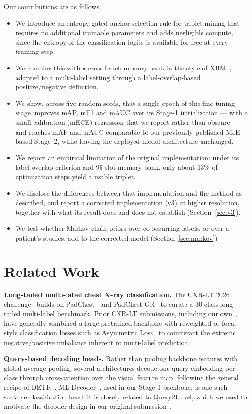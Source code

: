 \documentclass[conference]{IEEEtran}
\begin{document}
Our contributions are as follows.
\begin{itemize}
\item We introduce an entropy-gated anchor selection rule for triplet mining that requires no additional trainable parameters and adds negligible compute, since the entropy of the classification logits is available for free at every training step.
\item We combine this with a cross-batch memory bank in the style of XBM~\cite{b6}, adapted to a multi-label setting through a label-overlap-based positive/negative definition.
\item We show, across five random seeds, that a single epoch of this fine-tuning stage improves mAP, mF1 and mAUC over its Stage-1 initialization --- with a small calibration (mECE) regression that we report rather than obscure --- and reaches mAP and mAUC comparable to our previously published MoE-based Stage~2, while leaving the deployed model architecture unchanged.
\item We report an empirical limitation of the original implementation: under its label-overlap criterion and 96-slot memory bank, only about 13\% of optimization steps yield a usable triplet.
\item We disclose the differences between that implementation and the method as described, and report a corrected implementation (v3) at higher resolution, together with what its result does and does not establish (Section~\ref{sec:v3}).
\item We test whether Markov-chain priors over co-occurring labels, or over a patient's studies, add to the corrected model (Section~\ref{sec:markov}).
\end{itemize}

\section{Related Work}
\textbf{Long-tailed multi-label chest X-ray classification.} The CXR-LT 2026 challenge~\cite{b12} builds on PadChest~\cite{b9} and PadChest-GR~\cite{b10} to curate a 30-class long-tailed multi-label benchmark. Prior CXR-LT submissions, including our own~\cite{b12}, have generally combined a large pretrained backbone with reweighted or focal-style classification losses such as Asymmetric Loss~\cite{b3} to counteract the extreme negative/positive imbalance inherent to multi-label prediction.

\textbf{Query-based decoding heads.} Rather than pooling backbone features with global average pooling, several architectures decode one query embedding per class through cross-attention over the visual feature map, following the general recipe of DETR~\cite{b13}. ML-Decoder~\cite{b2}, used in our Stage-1 backbone, is one such scalable classification head; it is closely related to Query2Label, which we used to motivate the decoder design in our original submission~\cite{b12}.
\end{document}

